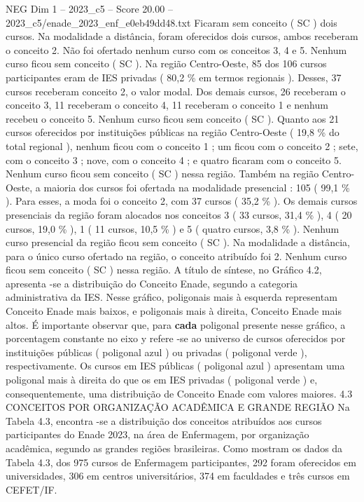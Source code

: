 \begin{textsample}{NEG Dim 1 – 2023\_c5 – Score 20.00 – 2023\_c5/enade\_2023\_enf\_e0eb49dd48.txt}
Ficaram sem conceito ( SC ) dois cursos.
Na modalidade a distância, foram oferecidos dois cursos, ambos receberam o conceito 2.
Não foi ofertado nenhum curso com os conceitos 3, 4 e 5.
Nenhum curso ficou sem conceito ( SC ).
Na região Centro-Oeste, 85 dos 106 cursos participantes eram de IES privadas ( 80,2 \% em termos regionais ).
Desses, 37 cursos receberam conceito 2, o valor modal.
Dos demais cursos, 26 receberam o conceito 3, 11 receberam o conceito 4, 11 receberam o conceito 1 e nenhum recebeu o conceito 5.
Nenhum curso ficou sem conceito ( SC ).
Quanto aos 21 cursos oferecidos por instituições públicas na região Centro-Oeste ( 19,8 \% do total regional ), nenhum ficou com o conceito 1 ; um ficou com o conceito 2 ; sete, com o conceito 3 ; nove, com o conceito 4 ; e quatro ficaram com o conceito 5.
Nenhum curso ficou sem conceito ( SC ) nessa região.
Também na região Centro-Oeste, a maioria dos cursos foi ofertada na modalidade presencial : 105 ( 99,1 \% ).
Para esses, a moda foi o conceito 2, com 37 cursos ( 35,2 \% ).
Os demais cursos presenciais da região foram alocados nos conceitos 3 ( 33 cursos, 31,4 \% ), 4 ( 20 cursos, 19,0 \% ), 1 ( 11 cursos, 10,5 \% ) e 5 ( quatro cursos, 3,8 \% ).
Nenhum curso presencial da região ficou sem conceito ( SC ).
Na modalidade a distância, para o único curso ofertado na região, o conceito atribuído foi 2.
Nenhum curso ficou sem conceito ( SC ) nessa região.
A título de síntese, no Gráfico 4.2, apresenta -se a distribuição do Conceito Enade, segundo a categoria administrativa da IES.
Nesse gráfico, poligonais mais à esquerda representam Conceito Enade mais baixos, e poligonais mais à direita, Conceito Enade mais altos.
É importante observar que, para \textbf{cada} poligonal presente nesse gráfico, a porcentagem constante no eixo y refere -se ao universo de cursos oferecidos por instituições públicas ( poligonal azul ) ou privadas ( poligonal verde ), respectivamente.
Os cursos em IES públicas ( poligonal azul ) apresentam uma poligonal mais à direita do que os em IES privadas ( poligonal verde ) e, consequentemente, uma distribuição de Conceito Enade com valores maiores. 4.3 CONCEITOS POR ORGANIZAÇÃO ACADÊMICA E GRANDE REGIÃO Na Tabela 4.3, encontra -se a distribuição dos conceitos atribuídos aos cursos participantes do Enade 2023, na área de Enfermagem, por organização acadêmica, segundo as grandes regiões brasileiras.
Como mostram os dados da Tabela 4.3, dos 975 cursos de Enfermagem participantes, 292 foram oferecidos em universidades, 306 em centros universitários, 374 em faculdades e três cursos em CEFET/IF.

\end{textsample}
